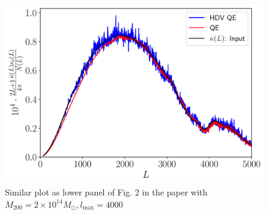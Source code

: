 \documentclass[10pt]{article}
\begin{document}
\begin{figure}[H]
	\centering
		\includegraphics[width=31pc]{Figures/biascomp_M2_lmax4k.pdf}
		\caption{Similar plot as lower panel of Fig. 2 in the paper with $M_{200}=2\times 10^{14}M_{\odot}, l_{\text{max}}=4000$}
	\label{fig1}
\end{figure}
\end{document}
